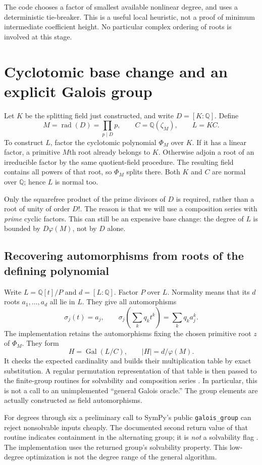 \documentclass[11pt,a4paper]{article}
\theoremstyle{definition}
\theoremstyle{remark}
\newcommand{\Q}{\mathbb Q}
\newcommand{\Gal}{\operatorname{Gal}}
\newcommand{\rad}{\operatorname{rad}}
\newcommand{\code}[1]{\texttt{#1}}
\newcommand{\z}{\zeta}
\begin{document}
The code chooses a factor of smallest available nonlinear degree, and uses a
deterministic tie-breaker. This is a useful local heuristic, not a proof of
minimum intermediate coefficient height. No particular complex ordering of
roots is involved at this stage.

\section{Cyclotomic base change and an explicit Galois group}
\label{sec:group}
Let $K$ be the splitting field just constructed, and write $D=[K:\Q]$. Define
\[
 M=\rad(D)=\prod_{p\mid D}p,\qquad C=\Q(\z_M),\qquad L=KC.
\]
To construct $L$, factor the cyclotomic polynomial $\Phi_M$ over $K$. If it has
a linear factor, a primitive $M$th root already belongs to $K$. Otherwise
adjoin a root of an irreducible factor by the same quotient-field procedure.
The resulting field contains all powers of that root, so $\Phi_M$ splits
there. Both $K$ and $C$ are normal over $\Q$; hence $L$ is normal too.

Only the squarefree product of the prime divisors of $D$ is required, rather
than a root of unity of order $D!$. The reason is that we will use a composition
series with \emph{prime} cyclic factors. This can still be an expensive base
change: the degree of $L$ is bounded by $D\varphi(M)$, not by $D$ alone.

\subsection{Recovering automorphisms from roots of the defining polynomial}
Write $L=\Q[t]/P$ and $d=[L:\Q]$. Factor $P$ over $L$. Normality means that its
$d$ roots $a_1,\ldots,a_d$ all lie in $L$. They give all automorphisms
\[
 \sigma_j(t)=a_j,\qquad
 \sigma_j\!\left(\sum_kq_kt^k\right)=\sum_kq_ka_j^k.
\]
The implementation retains the automorphisms fixing the chosen primitive root
$z$ of $\Phi_M$. They form
\[
 H=\Gal(L/C),\qquad |H|=d/\varphi(M).
\]
It checks the expected cardinality and builds their multiplication table by
exact substitution. A regular permutation representation of that table is then
passed to the finite-group routines for solvability and composition series
\cite{sympygroups}. In particular, this is not a call to an unimplemented
``general Galois oracle.'' The group elements are actually constructed as
field automorphisms.

For degrees through six a preliminary call to SymPy's public
\code{galois\_group} can reject nonsolvable inputs cheaply. The documented
second return value of that routine indicates containment in the alternating
group; it is \emph{not} a solvability flag \cite{sympyfields}. The implementation
uses the returned group's solvability property. This low-degree optimization
is not the degree range of the general algorithm.
\end{document}
